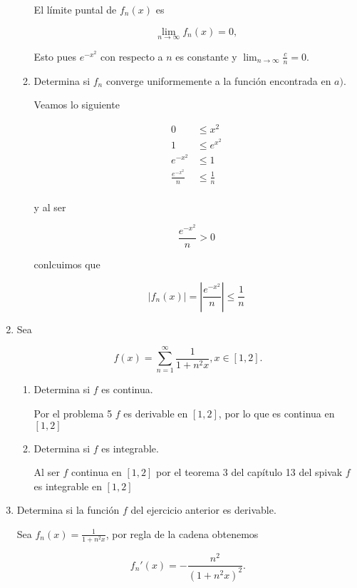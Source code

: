 \documentclass[letterpaper]{article}
\theoremstyle{definition}
\theoremstyle{lemathm}
\theoremstyle{lemademthm}
\newcommand{\limninf}{\lim_{n\to\infty}}
\begin{document}
\begin{enumerate}
\begin{enumerate}
			El límite puntal de $f_n(x)$ es
			
			\[\limninf f_n(x) = 0,\]
			
			Esto pues $e^{-x^2}$ con respecto a $n$ es constante y $\limninf \frac{c}{n} = 0$.

			\item Determina si $f_n$ converge uniformemente a la función encontrada en $a)$.
			
			Veamos lo siguiente

			\begin{align*}
				0 &\leq x^2\\
				1 &\leq e^{x^2}\\
				e^{-x^2} &\leq 1\\
				\frac{e^{-x^2}}{n} &\leq \frac{1}{n}\\
			\end{align*}

			y al ser 
			
			\[\frac{e^{-x^2}}{n} > 0\]

			conlcuimos que

			\[|f_n(x)| = \left|\frac{e^{-x^2}}{n}\right| \leq \frac{1}{n}\]

		\end{enumerate}

		\item Sea
		
		\[f(x) = \sum_{n=1}^{\infty} \frac{1}{1+n^2x}, x \in [1,2].\]

		\begin{enumerate}
			\item Determina si $f$ es continua.
			
			Por el problema 5 $f$ es derivable en $[1,2]$, por lo que es continua en $[1,2]$

			\item Determina si $f$ es integrable.
			
			Al ser $f$ continua en $[1,2]$ por el teorema 3 del capítulo 13 del spivak $f$ es integrable en $[1,2]$

		\end{enumerate}

		\newpage

		\item Determina si la función $f$ del ejercicio anterior es derivable.
		
		Sea $f_n(x) = \frac{1}{1+n^2x}$, por regla de la cadena obtenemos

		\[f_n'(x) = -\frac{n^2}{(1+n^2x)^2}.\]


\end{enumerate}
\end{document}
